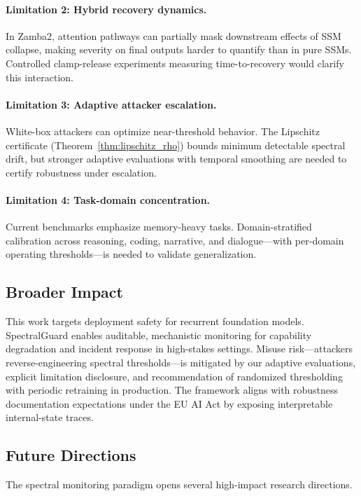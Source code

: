 \documentclass[10pt,twocolumn]{article}
\begin{document}
\paragraph{Limitation 2: Hybrid recovery dynamics.}
In Zamba2, attention pathways can partially mask downstream effects of SSM collapse, making severity on final outputs harder to quantify than in pure SSMs. Controlled clamp-release experiments measuring time-to-recovery would clarify this interaction.

\paragraph{Limitation 3: Adaptive attacker escalation.}
White-box attackers can optimize near-threshold behavior. The Lipschitz certificate (Theorem~\ref{thm:lipschitz_rho}) bounds minimum detectable spectral drift, but stronger adaptive evaluations with temporal smoothing are needed to certify robustness under escalation.

\paragraph{Limitation 4: Task-domain concentration.}
Current benchmarks emphasize memory-heavy tasks. Domain-stratified calibration across reasoning, coding, narrative, and dialogue---with per-domain operating thresholds---is needed to validate generalization.

\subsection{Broader Impact}

This work targets deployment safety for recurrent foundation models. SpectralGuard enables auditable, mechanistic monitoring for capability degradation and incident response in high-stakes settings. Misuse risk---attackers reverse-engineering spectral thresholds---is mitigated by our adaptive evaluations, explicit limitation disclosure, and recommendation of randomized thresholding with periodic retraining in production. The framework aligns with robustness documentation expectations under the EU AI Act by exposing interpretable internal-state traces.

\subsection{Future Directions}

The spectral monitoring paradigm opens several high-impact research directions.
\end{document}
